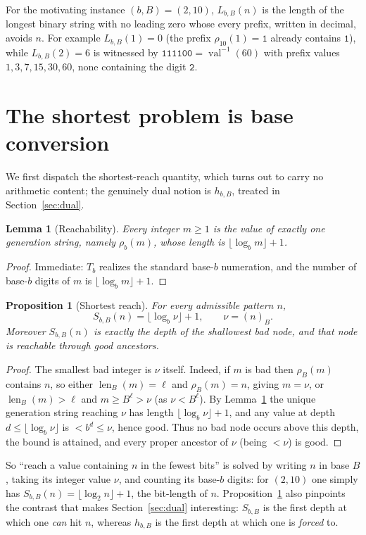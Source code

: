 \documentclass[11pt]{article}
\theoremstyle{plain}
\newtheorem{proposition}{Proposition}
\newtheorem{lemma}{Lemma}
\theoremstyle{definition}
\theoremstyle{remark}
\DeclareMathOperator{\val}{val}
\DeclareMathOperator{\len}{len}
\newcommand{\base}[2]{(#1)_{#2}}
\newcommand{\Lbb}{L_{b,B}}
\newcommand{\Sbb}{S_{b,B}}
\newcommand{\hbb}{h_{b,B}}
\begin{document}
For the motivating instance $(b,B)=(2,10)$, $\Lbb(n)$ is the length of the longest binary string with no leading zero whose every prefix, written in decimal, avoids $n$. For example $\Lbb(1)=0$ (the prefix $\rho_{10}(1)=\texttt{1}$ already contains $\texttt{1}$), while $\Lbb(2)=6$ is witnessed by $\texttt{111100}=\val^{-1}(60)$ with prefix values $1,3,7,15,30,60$, none containing the digit $\texttt{2}$.

\section{The shortest problem is base conversion}

We first dispatch the shortest-reach quantity, which turns out to carry no arithmetic content; the genuinely dual notion is $\hbb$, treated in Section~\ref{sec:dual}.

\begin{lemma}[Reachability]\label{lem:reach}
Every integer $m\ge 1$ is the value of exactly one generation string, namely $\rho_b(m)$, whose length is $\lfloor\log_b m\rfloor+1$.
\end{lemma}

\begin{proof}
Immediate: $T_b$ realizes the standard base-$b$ numeration, and the number of base-$b$ digits of $m$ is $\lfloor\log_b m\rfloor+1$.
\end{proof}

\begin{proposition}[Shortest reach]\label{prop:short}
For every admissible pattern $n$,
\[
\Sbb(n)=\lfloor\log_b \nu\rfloor+1,\qquad \nu=\base{n}{B}.
\]
Moreover $\Sbb(n)$ is exactly the depth of the shallowest bad node, and that node is reachable through good ancestors.
\end{proposition}

\begin{proof}
The smallest bad integer is $\nu$ itself. Indeed, if $m$ is bad then $\rho_B(m)$ contains $n$, so either $\len_B(m)=\ell$ and $\rho_B(m)=n$, giving $m=\nu$, or $\len_B(m)>\ell$ and $m\ge B^{\ell}>\nu$ (as $\nu<B^{\ell}$). By Lemma~\ref{lem:reach} the unique generation string reaching $\nu$ has length $\lfloor\log_b\nu\rfloor+1$, and any value at depth $d\le \lfloor\log_b\nu\rfloor$ is $<b^{d}\le\nu$, hence good. Thus no bad node occurs above this depth, the bound is attained, and every proper ancestor of $\nu$ (being $<\nu$) is good.
\end{proof}

So ``reach a value containing $n$ in the fewest bits'' is solved by writing $n$ in base $B$, taking its integer value $\nu$, and counting its base-$b$ digits: for $(2,10)$ one simply has $\Sbb(n)=\lfloor\log_2 n\rfloor+1$, the bit-length of $n$. Proposition~\ref{prop:short} also pinpoints the contrast that makes Section~\ref{sec:dual} interesting: $\Sbb$ is the first depth at which one \emph{can} hit $n$, whereas $\hbb$ is the first depth at which one is \emph{forced} to.
\end{document}
